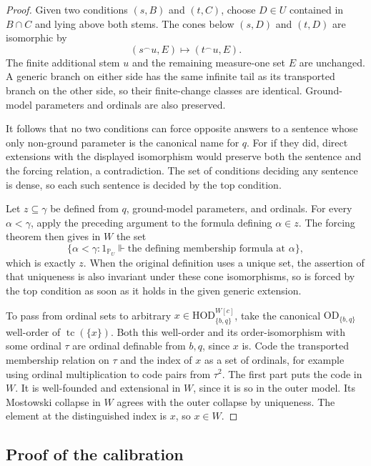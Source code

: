 \documentclass[11pt,letterpaper]{article}
\theoremstyle{definition}
\numberwithin{equation}{section}
\newcommand{\HOD}{\mathrm{HOD}}
\newcommand{\OD}{\mathrm{OD}}
\newcommand{\PP}{\mathbb P}
\newcommand{\tc}{\operatorname{tc}}
\begin{document}
\begin{proof}
Given two conditions $(s,B)$ and $(t,C)$, choose
$D\in U$ contained in $B\cap C$ and lying above both stems. The cones below $(s,D)$ and $(t,D)$ are isomorphic by
\[
 (s^\frown u,E)\longmapsto(t^\frown u,E).
\]
The finite additional stem $u$ and the remaining measure-one set $E$ are unchanged. A generic branch on either side has the same infinite tail as its transported branch on the other side, so their finite-change classes are identical. Ground-model parameters and ordinals are also preserved.

It follows that no two conditions can force opposite answers to a sentence whose only non-ground parameter is the canonical name for $q$. For if they did, direct extensions with the displayed isomorphism would preserve both the sentence and the forcing relation, a contradiction. The set of conditions deciding any sentence is dense, so each such sentence is decided by the top condition.

Let $z\subseteq\gamma$ be defined from $q$, ground-model parameters, and ordinals. For every $\alpha<\gamma$, apply the preceding argument to the formula defining $\alpha\in z$. The forcing theorem then gives in $W$ the set
\[
 \{\alpha<\gamma:1_{\PP_U}\Vdash\text{the defining membership formula at }\alpha\},
\]
which is exactly $z$. When the original definition uses a unique set, the assertion of that uniqueness is also invariant under these cone isomorphisms, so is forced by the top condition as soon as it holds in the given generic extension.

To pass from ordinal sets to arbitrary $x\in\HOD^{W[c]}_{\{b,q\}}$, take the canonical $\OD_{\{b,q\}}$ well-order of $\tc(\{x\})$. Both this well-order and its order-isomorphism with some ordinal $\tau$ are ordinal definable from $b,q$, since $x$ is. Code the transported membership relation on $\tau$ and the index of $x$ as a set of ordinals, for example using ordinal multiplication to code pairs from $\tau^2$. The first part puts the code in $W$. It is well-founded and extensional in $W$, since it is so in the outer model. Its Mostowski collapse in $W$ agrees with the outer collapse by uniqueness. The element at the distinguished index is $x$, so $x\in W$.
\end{proof}

\subsection{Proof of the calibration}
\end{document}
